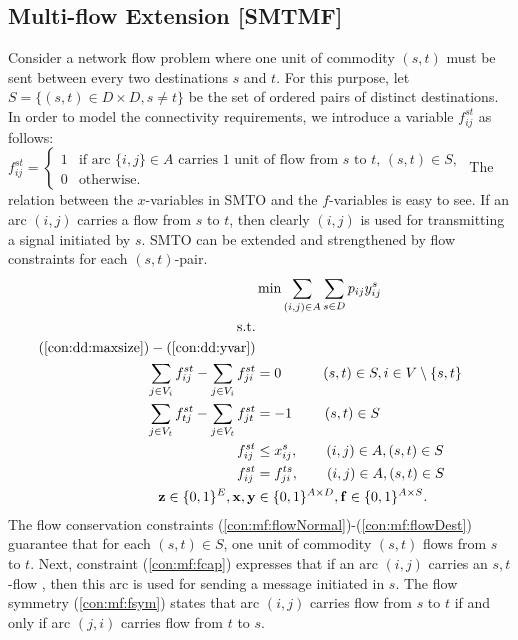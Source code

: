 \subsection{Multi-flow Extension [SMTMF]}
Consider a network flow problem where one unit of commodity $(s,t)$ must be sent between every two destinations $s$ and $t$. For this purpose, let $S=\{(s,t)\in D\times D, s\neq t\}$ be the set of ordered pairs of distinct destinations. In order to model the connectivity requirements, we introduce a variable $f^{st}_{ij}$ as follows:
\newline\newline
  $f_{ij}^{st}=
	\begin{cases}
    1 & \text{if arc $\{i,j\} \in A$ carries 1 unit of flow from $s$ to $t$, $(s,t)\in S$},\\
    0 & \text{otherwise}.
  \end{cases}$
\newline\newline
The relation between the $x$-variables in SMTO and the $f$-variables is easy to see. If an arc $(i,j)$ carries a flow from $s$ to $t$, then clearly $(i,j)$ is used for transmitting a signal initiated by $s$.
SMTO can be extended and strengthened by flow constraints for each $(s,t)$-pair.
\newline
\newline    
\begin{subequations}
\begin{flalign}
\label{objective:dd} \makebox[0pt][l]{$\displaystyle{} \min \sum\limits_{(i,j) \in A} \sum\limits_{s \in D} p_{ij} y^s_{ij} $}  \\ 
\text{s.t.}    \notag   \\	
(\ref{con:dd:maxsize}) - (\ref{con:dd:yvar}) \notag \\ 
 \label{con:mf:flowNormal}  \sum\limits_{\substack{ j\in V_i}}f^{st}_{ij}-\sum\limits_{\substack{j\in V_i }}f^{st}_{ji}    & = 0   \quad \quad\quad 			  (s,t)\in S, i\in V\setminus\{s,t\} &\\	
\label{con:mf:flowDest}  \sum\limits_{\substack{ j\in V_t }}f^{st}_{tj}-\sum\limits_{\substack{j\in V_t}}f^{st}_{jt}    & = -1  \quad\quad ~ (s,t)\in S &\\	
 \label{con:mf:fcap}   f^{st}_{ij} &\leq  x^{s}_{ij},\quad\quad    (i,j)\in A, (s,t)\in S & \\ 		 			 	 
 \label{con:mf:fsym}   f^{st}_{ij} &=  f^{ts}_{ji},  \quad\quad(i,j)\in A, (s,t)\in S &\\   
\label{con:mf:xydim}	\mathbf{z} \in \{0,1\}^{E}, \mathbf{x},\mathbf{y} &\in \{0,1\}^{A\times D},  \mathbf{f}\in\{0,1\}^{A\times S}. 
\end{flalign}~
\end{subequations}  
The flow conservation constraints (\ref{con:mf:flowNormal})-(\ref{con:mf:flowDest}) guarantee that for each $(s,t)\in S$, one unit of commodity $(s,t)$ flows from $s$ to $t$. Next, constraint (\ref{con:mf:fcap}) expresses that if an arc $(i,j)$ carries an $s,t$-flow , then this arc is used for sending a message initiated in $s$. The flow symmetry (\ref{con:mf:fsym}) states that arc $(i,j)$ carries flow from $s$ to $t$ if and only if arc $(j,i)$ carries flow from $t$ to $s$.


